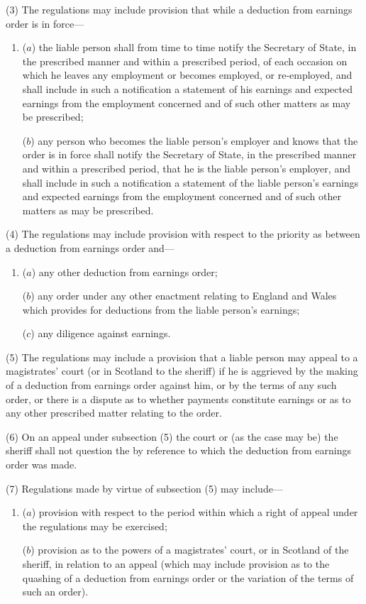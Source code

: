 \documentclass[12pt,a4paper]{article}
\begin{document}
(3) The regulations may include provision that while a deduction from earnings order is in force---
\begin{enumerate}\item[]
($a$) the liable person shall from time to time notify the Secretary of State, in the prescribed manner and within a prescribed period, of each occasion on which he leaves any employment or becomes employed, or re-employed, and shall include in such a notification a statement of his earnings and expected earnings from the employment concerned and of such other matters as may be prescribed;

($b$) any person who becomes the liable person’s employer and knows that the order is in force shall notify the Secretary of State, in the prescribed manner and within a prescribed period, that he is the liable person’s employer, and shall include in such a notification a statement of the liable person’s earnings and expected earnings from the employment concerned and of such other matters as may be prescribed.
\end{enumerate}

(4) The regulations may include provision with respect to the priority as between a deduction from earnings order and---
\begin{enumerate}\item[]
($a$) any other deduction from earnings order;

($b$) any order under any other enactment relating to England and Wales which provides for deductions from the liable person’s earnings;

($c$) any diligence against earnings.
\end{enumerate}

(5) The regulations may include a provision that a liable person may appeal to a magistrates’ court (or in Scotland to the sheriff) if he is aggrieved by the making of a deduction from earnings order against him, or by the terms of any such order,
or there is a dispute as to whether payments constitute earnings or as to any other prescribed matter relating to the order.

(6) On an appeal under subsection (5) the court or (as the case may be) the sheriff shall not question the  by reference to which the deduction from earnings order was made.

(7) Regulations made by virtue of subsection (5) may include---
\begin{enumerate}\item[]
($a$) provision with respect to the period within which a right of appeal under the
regulations may be exercised;

($b$) provision as to the powers of a magistrates’ court, or in Scotland of the
sheriff, in relation to an appeal (which may include provision as to the
quashing of a deduction from earnings order or the variation of the terms of
such an order).
\end{enumerate}
\end{document}

